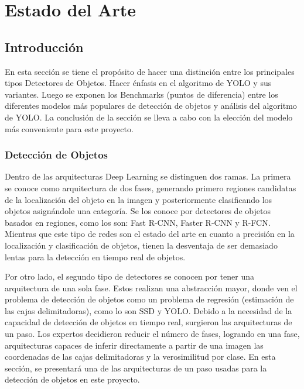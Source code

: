 \chapter{Estado del Arte}
\label{Estado del Arte - YOLO}

\section{Introducción}
En esta sección se tiene el propósito de hacer una distinción entre los principales tipos Detectores de Objetos. Hacer énfasis en el algoritmo de YOLO y sus variantes. Luego se exponen los Benchmarks (puntos de diferencia) entre los diferentes modelos más populares de detección de objetos y análisis del algoritmo de YOLO. La conclusión de la sección se lleva a cabo con la elección del modelo más conveniente para este proyecto.

\subsection{Detección de Objetos}

Dentro de las arquitecturas Deep Learning se distinguen dos ramas. La primera se conoce como arquitectura de dos fases, generando primero regiones candidatas de la localización del objeto en la imagen y posteriormente clasificando los objetos asignándole una categoría. Se los conoce por detectores de objetos basados en regiones, como los son: Fast R-CNN, Faster R-CNN y R-FCN. Mientras que este tipo de redes son el estado del arte en cuanto a precisión en la localización y clasificación de objetos, tienen la desventaja de ser demasiado lentas para la detección en tiempo real de objetos.

Por otro lado, el segundo tipo de detectores se conocen por tener una arquitectura de una sola fase. Estos realizan una abstracción mayor, donde ven el problema de detección de objetos como un problema de regresión (estimación de las cajas delimitadoras), como lo son SSD y YOLO. Debido a la necesidad de la capacidad de detección de objetos en tiempo real, surgieron las arquitecturas de un paso. Los expertos decidieron reducir el número de fases, logrando en una fase, arquitecturas capaces de inferir directamente a partir de una imagen las coordenadas de las cajas delimitadoras y la verosimilitud por clase. En esta sección, se presentará una de las arquitecturas de un paso usadas
para la detección de objetos en este proyecto.


